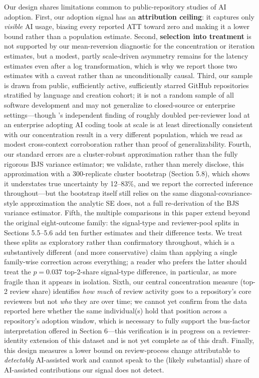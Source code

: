 \documentclass[12pt]{article}
\begin{document}
Our design shares limitations common to public-repository studies of AI
adoption. First, our adoption signal has an \textbf{attribution ceiling}:
it captures only \emph{visible} AI usage, biasing every reported ATT
toward zero and making it a lower bound rather than a population
estimate. Second, \textbf{selection into treatment} is not supported by
our mean-reversion diagnostic for the concentration or iteration
estimates, but a modest, partly scale-driven asymmetry remains for the
latency estimates even after a log transformation, which is why we report
those two estimates with a caveat rather than as unconditionally causal.
Third, our sample is drawn from public, sufficiently active,
sufficiently starred GitHub repositories stratified by language and
creation cohort; it is not a random sample of all software development
and may not generalize to closed-source or enterprise settings---though
\citet{he2026aiwrites}'s independent finding of roughly doubled
per-reviewer load at an enterprise adopting AI coding tools at scale is
at least directionally consistent with our concentration result in a very
different population, which we read as modest cross-context
corroboration rather than proof of generalizability. Fourth, our
standard errors are a cluster-robust approximation rather than the fully
rigorous BJS variance estimator; we validate, rather than merely
disclose, this approximation with a 300-replicate cluster bootstrap
(Section 5.8), which shows it understates true uncertainty by 12--83\%,
and we report the corrected inference throughout---but the bootstrap
itself still relies on the same diagonal-covariance-style approximation
the analytic SE does, not a full re-derivation of the BJS variance
estimator. Fifth, the multiple comparisons in this paper extend beyond
the original eight-outcome family: the signal-type and reviewer-pool
splits in Sections 5.5--5.6 add ten further estimates and their
difference tests. We treat these splits as exploratory rather than
confirmatory throughout, which is a substantively different (and more
conservative) claim than applying a single family-wise correction across
everything; a reader who prefers the latter should treat the $p=0.037$
top-2-share signal-type difference, in particular, as more fragile than
it appears in isolation. Sixth, our central concentration measure
(top-2 review share) identifies \emph{how much} of review activity goes
to a repository's core reviewers but not \emph{who} they are over
time; we cannot yet confirm from the data reported here whether the same
individual(s) hold that position across a repository's adoption window,
which is necessary to fully support the bus-factor interpretation offered
in Section 6---this verification is in progress on a reviewer-identity
extension of this dataset and is not yet complete as of this draft.
Finally, this design measures a lower bound on review-process change
attributable to \emph{detectably} AI-assisted work and cannot speak to
the (likely substantial) share of AI-assisted contributions our signal
does not detect.
\end{document}
